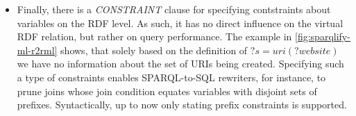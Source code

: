 \begin{itemize}
%

  \item Finally, there is a \emph{CONSTRAINT} clause for specifying
  contstraints about variables on the RDF level. As such, it has no direct
  influence on the virtual RDF relation, but rather on query performance.
  The example in \autoref{fig:sparqlify-ml-r2rml} shows, that
  solely based on the definition of $?s = uri(?website)$ we have no information
  about the set of URIs being created. Specifying such a type of constraints
  enables SPARQL-to-SQL rewriters, for instance, to prune joins whose join
  condition equates variables with disjoint sets of prefixes. Syntactically, up
  to now only stating prefix constraints is supported.
\end{itemize}






